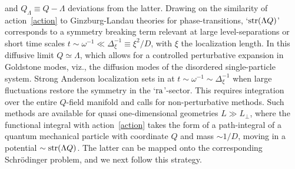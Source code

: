 \documentclass[twocolumn,showpacs,aps,prl]{revtex4}
\begin{document}
and $Q_\Lambda\equiv Q-\Lambda$ deviations from the latter. 
Drawing on the similarity of action~\eqref{action}
to Ginzburg-Landau theories for phase-transitions,
`${\rm str}(\Lambda Q)$' corresponds to a symmetry breaking term 
relevant at large level-separations or short time scales 
$t\sim\omega^{-1}\ll\Delta_\xi^{-1} \equiv \xi^2/D$, with 
 $\xi$ the localization length.    
In this 
diffusive limit $Q\simeq \Lambda$, which allows for a controlled perturbative expansion in Goldstone modes, viz.,  
the diffusion modes of the disordered single-particle system. 
Strong Anderson localization sets in at $t\sim\omega^{-1}\sim\Delta^{-1}_\xi$ when   
large fluctuations restore the symmetry in the `${\rm ra}$'-sector. 
This requires integration over the entire $Q$-field manifold and calls for 
non-perturbative methods. 
Such methods are available for quasi one-dimensional geometries $L\gg L_\perp$,
where the functional integral with action~\eqref{action} 
takes the form of a path-integral of a quantum mechanical particle with coordinate $Q$ and 
mass $\sim 1/D$, moving in a potential $\sim{\rm str}(\Lambda Q)$. 
The latter can be mapped onto the corresponding 
Schr\"odinger problem,  
and we next follow this strategy.
\end{document}
